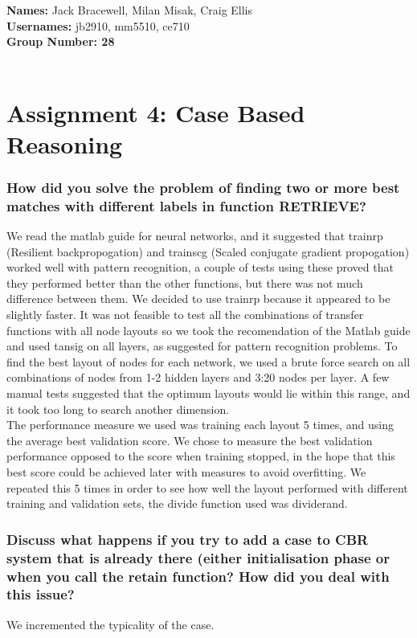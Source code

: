 \documentclass[12pt]{article}
\begin{document}
{\bf Names:} Jack Bracewell, Milan Misak, Craig Ellis \\
{\bf Usernames:} jb2910, mm5510, ce710 \\
{\bf Group Number: 28}  \\ \\

\section*{Assignment 4: Case Based Reasoning}

\subsubsection*{How did you solve the problem of finding two or more best matches with different labels in function RETRIEVE?}

We read the matlab guide for neural networks, and it suggested that trainrp (Resilient backpropogation) and trainscg (Scaled conjugate gradient propogation) worked well with pattern recognition, a couple of tests using these proved that they performed better than the other functions, but there was not much difference between them. We decided to use trainrp because it appeared to be slightly faster. It was not feasible to test all the combinations of transfer functions with all node layouts so we took the recomendation of the Matlab guide and used tansig on all layers, as suggested for pattern recognition problems. To find the best layout of nodes for each network, we used a brute force search on all combinations of nodes from 1-2 hidden layers and 3:20 nodes per layer. A few manual tests suggested that the optimum layouts would lie within this range, and it took too long to search another dimension.\\
The performance measure we used was training each layout 5 times, and using the average best validation score. We chose to measure the best validation performance opposed to the score when training stopped, in the hope that this best score could be achieved later with measures to avoid overfitting. We repeated this 5 times in order to see how well the layout performed with different training and validation sets, the divide function used was dividerand.


\subsubsection*{Discuss what happens if you try to add a case to CBR system that is already there (either initialisation phase or when you call the retain function? How did you deal with this issue?}
We incremented the typicality of the case.
\end{document}

